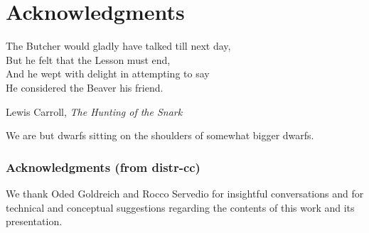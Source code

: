\cleartorecto %
\chapter{Acknowledgments} %
\thispagestyle{plain} %

\epigraph{The Butcher would gladly have talked till next day,\\
But he felt that the Lesson must end,\\
And he wept with delight in attempting to say\\
He considered the Beaver his friend.}{Lewis Carroll, \textit{The Hunting of the Snark}}

We are but dwarfs sitting on the shoulders of somewhat bigger dwarfs.


\subsection{Acknowledgments (from distr-cc)}
We thank Oded Goldreich and Rocco Servedio for insightful conversations and for technical and conceptual suggestions regarding the contents of this work and its presentation.
